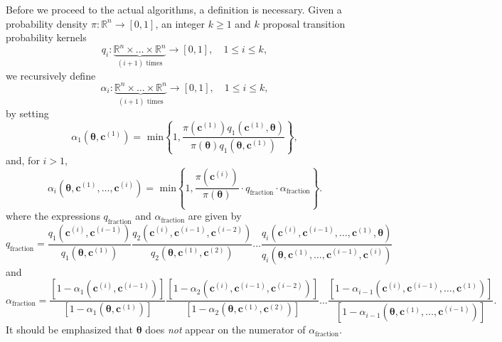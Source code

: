 Before we proceed to the actual algorithms, a definition is necessary.
Given a probability density $\pi:\mathbb{R}^n\rightarrow [0,1]$,
an integer $k\geqslant 1$ and
$k$ proposal transition probability kernels
\begin{equation*}
q_i:\underbrace{\mathbb{R}^n\times\ldots\times\mathbb{R}^n}_{(i+1)\text{ times}}\rightarrow [0,1],\quad 1\leqslant i\leqslant k,
\end{equation*}
we recursively define
\begin{equation}\label{eq-alphas}
\alpha_i:\underbrace{\mathbb{R}^n\times\ldots\times\mathbb{R}^n}_{(i+1)\text{ times}}\rightarrow [0,1],\quad 1\leqslant i\leqslant k,
\end{equation}
by setting
\begin{equation*}
\alpha_1(\boldsymbol{\theta},\mathbf{c}^{(1)}) = \text{ min}
\left\{
1,\frac
{\pi(\mathbf{c}^{(1)})q_1(\mathbf{c}^{(1)},\boldsymbol{\theta})}
{\pi(\boldsymbol{\theta})q_1(\boldsymbol{\theta},\mathbf{c}^{(1)})}
\right\},
\end{equation*}
and, for $i>1$,
\begin{equation*}
\alpha_i(\boldsymbol{\theta},\mathbf{c}^{(1)},\ldots,\mathbf{c}^{(i)}) = \text{ min}
\left\{
1,\frac
{\pi(\mathbf{c}^{(i)})}
{\pi(\boldsymbol{\theta})}
\cdot q_{\text{fraction}}
\cdot \alpha_{\text{fraction}}
\right\}.
\end{equation*}
where
the expressions $q_{\text{fraction}}$ and $\alpha_{\text{fraction}}$ are given by
\begin{equation*}
q_{\text{fraction}}=
\frac
{q_1(\mathbf{c}^{(i)},\mathbf{c}^{(i-1)})}
{q_1(\boldsymbol{\theta},\mathbf{c}^{(1)})}
\frac
{q_2(\mathbf{c}^{(i)},\mathbf{c}^{(i-1)},\mathbf{c}^{(i-2)})}
{q_2(\boldsymbol{\theta},\mathbf{c}^{(1)},\mathbf{c}^{(2)})}
\ldots
\frac
{q_i(\mathbf{c}^{(i)},\mathbf{c}^{(i-1)},\ldots,\mathbf{c}^{(1)},\boldsymbol{\theta})}
{q_i(\boldsymbol{\theta},\mathbf{c}^{(1)},\ldots,\mathbf{c}^{(i-1)},\mathbf{c}^{(i)})}
\end{equation*}
and
\begin{equation*}
\alpha_{\text{fraction}}=
\frac
{[1-\alpha_1(\mathbf{c}^{(i)},\mathbf{c}^{(i-1)})]}
{[1-\alpha_1(\boldsymbol{\theta},\mathbf{c}^{(1)})]}
\frac
{[1-\alpha_2(\mathbf{c}^{(i)},\mathbf{c}^{(i-1)},\mathbf{c}^{(i-2)})]}
{[1-\alpha_2(\boldsymbol{\theta},\mathbf{c}^{(1)},\mathbf{c}^{(2)})]}
\ldots
\frac
{[1-\alpha_{i-1}(\mathbf{c}^{(i)},\mathbf{c}^{(i-1)},\ldots,\mathbf{c}^{(1)})]}
{[1-\alpha_{i-1}(\boldsymbol{\theta},\mathbf{c}^{(1)},\ldots,\mathbf{c}^{(i-1)})]}.
\end{equation*}
It should be emphasized that $\boldsymbol{\theta}$ does {\it not} appear on the numerator of $\alpha_{\text{fraction}}$.

